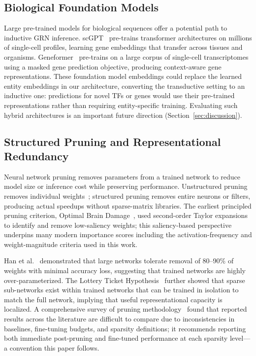 \documentclass[journal]{IEEEtran}
\begin{document}
\subsection{Biological Foundation Models}

Large pre-trained models for biological sequences offer a potential path to
inductive GRN inference. scGPT~\cite{cui2024} pre-trains transformer
architectures on millions of single-cell profiles, learning gene embeddings
that transfer across tissues and organisms. Geneformer~\cite{theodoris2023}
pre-trains on a large corpus of single-cell transcriptomes using a masked
gene prediction objective, producing context-aware gene representations.
These foundation model embeddings could replace the learned entity embeddings
in our architecture, converting the transductive setting to an inductive one:
predictions for novel TFs or genes would use their pre-trained representations
rather than requiring entity-specific training. Evaluating such hybrid
architectures is an important future direction
(Section~\ref{sec:discussion}).

\subsection{Structured Pruning and Representational Redundancy}

Neural network pruning removes parameters from a trained network to reduce
model size or inference cost while preserving performance. Unstructured pruning
removes individual weights~\cite{han2015}; structured pruning removes entire
neurons or filters, producing actual speedups without sparse-matrix libraries.
The earliest principled pruning criterion, Optimal Brain Damage~\cite{lecun1990},
used second-order Taylor expansions to identify and remove low-saliency
weights; this saliency-based perspective underpins many modern importance
scores including the activation-frequency and weight-magnitude criteria used
in this work.

Han et al.~\cite{han2015} demonstrated that large networks tolerate removal
of 80--90\% of weights with minimal accuracy loss, suggesting that trained
networks are highly over-parameterized. The Lottery Ticket
Hypothesis~\cite{frankle2019} further showed that sparse sub-networks exist
within trained networks that can be trained in isolation to match the full
network, implying that useful representational capacity is localized.
A comprehensive survey of pruning methodology~\cite{blalock2020} found that
reported results across the literature are difficult to compare due to
inconsistencies in baselines, fine-tuning budgets, and sparsity definitions;
it recommends reporting both immediate post-pruning and fine-tuned
performance at each sparsity level---a convention this paper follows.
\end{document}
